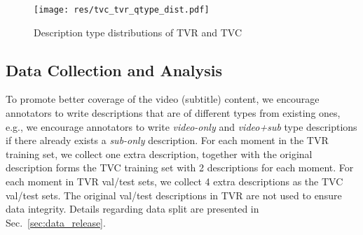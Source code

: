 \documentclass[runningheads]{llncs}
\begin{document}
\begin{table}[!t]
\setlength{\tabcolsep}{0.15em}
\small
\centering
\small
\caption{Comparison of TVC with existing video captioning datasets. \textit{Desc. context} = Description context, it indicates which modality the descriptions are related to}
\label{tab:tvc_dset_comparison}
\end{table}


\begin{figure}[!t]
  \centering
  \texttt{[image: res/tvc\_tvr\_qtype\_dist.pdf]}
  \caption{Description type distributions of TVR and TVC}
  \label{fig:tvc_tvr_qtype_dist}
\end{figure}



\subsection{Data Collection and Analysis}
To promote better coverage of the video (subtitle) content, we encourage annotators to write descriptions that are of different types from existing ones, e.g., we encourage annotators to write \textit{video-only} and \textit{video+sub} type descriptions if there already exists a \textit{sub-only} description. 
For each moment in the TVR training set, we collect one extra description, together with the original description forms the TVC training set with 2 descriptions for each moment.
For each moment in TVR val/test sets, we collect 4 extra descriptions as the TVC val/test sets.
The original val/test descriptions in TVR are not used to ensure data integrity. 
Details regarding data split are presented in Sec.~\ref{sec:data_release}.
\end{document}
